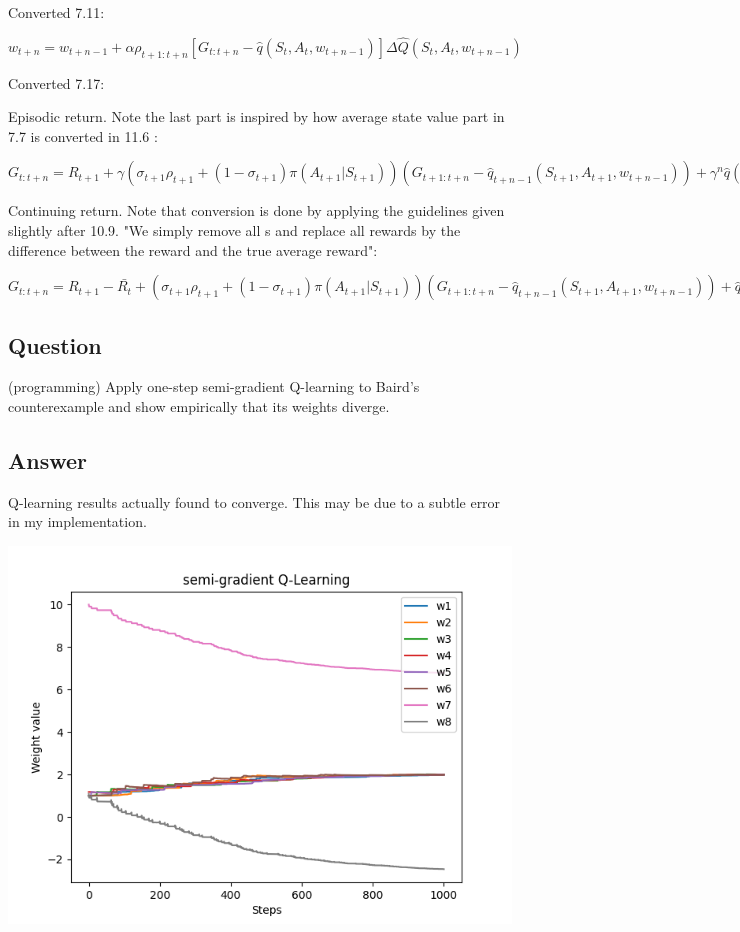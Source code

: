 \documentclass[11pt]{article}
\begin{document}
    Converted 7.11:

    \noindent $ w_{t+n} = w_{t+n-1} + \alpha \rho_{t+1:t+n} [G_{t:t+n} - \hat{q}(S_t,A_t, w_{t+n-1}) ] \Delta\hat{Q}(S_t,A_t, w_{t+n-1})$

    \hfill \break
    \noindent Converted 7.17:

    \noindent Episodic return.
    Note the last part is inspired by how average state value part in 7.7 is converted in 11.6 :

    \noindent $ G_{t:t+n} = R_{t+1} + \gamma  (\sigma_{t+1} \rho_{t+1} + (1-\sigma_{t+1}) \pi(A_{t+1}|S_{t+1})  ) (G_{t+1:t+n} - \hat{q}_{t+n-1}(S_{t+1},A_{t+1}, w_{t+n-1})) + \gamma^n \hat{q}(S_{t+n},A_{t+n}, w_{t+n-1}) $

    \hfill \break
    \noindent Continuing return.
    Note that conversion is done by applying the guidelines given slightly after 10.9.
    "We simply remove all s and replace all rewards by the difference between the reward and the true average reward":

    \noindent $ G_{t:t+n} = R_{t+1} - \bar{R_{t}} + (\sigma_{t+1} \rho_{t+1} + (1-\sigma_{t+1}) \pi(A_{t+1}|S_{t+1})  ) (G_{t+1:t+n} - \hat{q}_{t+n-1}(S_{t+1},A_{t+1}, w_{t+n-1})) + \hat{q}(S_{t+n},A_{t+n}, w_{t+n-1}) $


    \subsection{Question}

    (programming) Apply one-step semi-gradient Q-learning to Baird’s counterexample and show empirically that its weights diverge.

    \subsection*{Answer}

    Q-learning results actually found to converge.
    This may be due to a subtle error in my implementation.

    \includegraphics[scale=0.7]{exercise_11_3}
\end{document}
